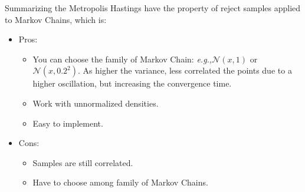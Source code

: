 \documentclass{article}
\newcommand{\eg}{\textit{e.g.,}}
\begin{document}
Summarizing the Metropolis Hastings have the property of reject samples applied to Markov Chains, which is:
\begin{itemize}
    \item Pros: \begin{itemize}
        \item You can choose the family of Markov Chain: \eg $\mathcal{N}(x, 1)$ or $\mathcal{N}(x, 0.2^2)$. As higher the variance, less correlated the points due to a higher oscillation, but increasing the convergence time.
        \item Work with unnormalized densities.
        \item Easy to implement.
    \end{itemize}
    \item Cons: \begin{itemize}
        \item Samples are still correlated.
        \item Have to choose among family of Markov Chains.
    \end{itemize}
\end{itemize}
\end{document}
